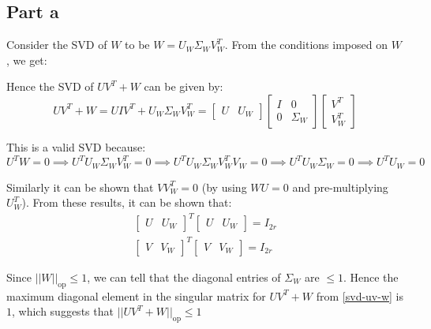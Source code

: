 \documentclass[11pt]{article}
\begin{document}
\subsection*{Part a}
\begin{flushleft}
Consider the SVD of \(W\) to be \(W = U_{W} \Sigma_{W} V^{T}_{W}\). From the conditions imposed on \(W\), we get: 

Hence the SVD of \(UV^{T} + W\) can be given by:
\begin{equation}
\label{svd-uv-w}
UV^{T} + W = U I V^{T} + U_{W} \Sigma_{W} V^{T}_{W} = \begin{bmatrix} U & U_{W} \end{bmatrix} \begin{bmatrix} I & 0 \\ 0 & \Sigma_{W} \end{bmatrix} \begin{bmatrix} V^{T} \\ V_{W}^{T} \end{bmatrix}
\end{equation}

This is a valid SVD because:
\begin{equation*}
U^{T}W = 0 \implies U^{T}U_{W}\Sigma_{W}V^{T}_{W} = 0 \implies U^{T}U_{W}\Sigma_{W}V^{T}_{W}V_{W} = 0 \implies U^{T}U_{W}\Sigma_{W} = 0 \implies U^{T}U_{W} = 0
\end{equation*}

Similarly it can be shown that \(VV_{W}^{T} = 0\) (by using \(WU = 0\) and pre-multiplying \(U^{T}_{W}\)). From these results, it can be shown that:
\begin{gather*}
\begin{bmatrix} U & U_{W} \end{bmatrix}^{T} \begin{bmatrix} U & U_{W} \end{bmatrix} = I_{2r} \\
\begin{bmatrix} V & V_{W} \end{bmatrix}^{T} \begin{bmatrix} V & V_{W} \end{bmatrix} = I_{2r}
\end{gather*}

Since \(||W||_{\text{op}} \leq 1\), we can tell that the diagonal entries of \(\Sigma_{W}\) are \(\leq 1\). Hence the maximum diagonal element in the singular matrix for \(UV^{T} + W\) from \ref{svd-uv-w} is \(1\), which suggests that \(||UV^{T} + W||_{\text{op}} \leq 1\)
\end{flushleft}
\end{document}
